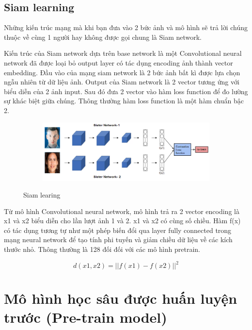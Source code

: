 \subsection{Siam learning}

Những kiến trúc mạng mà khi bạn đưa vào 2 bức ảnh và mô hình sẽ trả lời chúng thuộc về
cùng 1 người hay không được gọi chung là Siam network.

Kiến trúc của Siam network dựa trên base network là một Convolutional neural network
đã được loại bỏ output layer có tác dụng encoding ảnh thành vector embedding.
Đầu vào của mạng siam network là 2 bức ảnh bất kì được lựa chọn ngẫu nhiên từ dữ liệu ảnh.
Output của Siam network là 2 vector tương ứng với biểu diễn của 2 ảnh input.
Sau đó đưa 2 vector vào hàm loss function để đo lường sự khác biệt giữa chúng.
Thông thường hàm loss function là một hàm chuẩn bậc 2.

\begin{figure}
    \begin{subfigure}{1.\textwidth}
        \begin{center}
            \includegraphics[width=1.\linewidth]{Chapters/items/chap2_16.jpg}
        \end{center}
        \label{fig:chap2_16}
    \end{subfigure}
    \caption{Siam learing}
\end{figure}

\newpage
Từ mô hình Convolutional neural network, mô hình trả ra 2 vector encoding là x1 và x2
biểu diễn cho lần lượt ảnh 1 và 2. x1 và x2 có cùng số chiều.
Hàm f(x) có tác dụng tương tự như một phép biến đổi qua layer fully connected
trong mạng neural network để tạo tính phi tuyến và giảm chiều dữ liệu về các kích thước nhỏ.
Thông thường là 128 đối đối với các mô hình pretrain.


\begin{equation}
    d(x1, x2) = ||f(x1)-f(x2)||^2
\end{equation}

\newpage
\section{Mô hình học sâu được huấn luyện trước (Pre-train model)}
